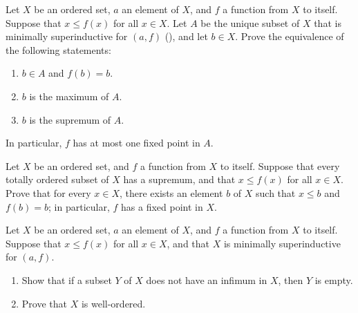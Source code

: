 \documentclass{article}
\begin{document}
\begin{exercise}
  \label{exe:ycuba4tr}
  Let \(X\) be an ordered set, \(a\) an element of \(X\), and \(f\) a
  function from \(X\) to itself.  Suppose that \(x \leq f(x)\) for all
  \(x \in X\).  Let \(A\) be the unique subset of \(X\) that is
  minimally superinductive for \((a, f)\) (), and
  let \(b \in X\).  Prove the equivalence of the following statements:
  \begin{enumerate}
  \item \label{item:31iv9t84} \(b \in A\) and \(f(b) = b\).
  \item \label{item:zg0eno8k} \(b\) is the maximum of \(A\).
  \item \label{item:zhfu99x4} \(b\) is the supremum of \(A\).
  \end{enumerate}
  In particular, \(f\) has at most one fixed point in \(A\).
\end{exercise}

\begin{exercise}
  \label{exe:al7fffh1}
  Let \(X\) be an ordered set, and \(f\) a function from \(X\) to
  itself.  Suppose that every totally ordered subset of \(X\) has a
  supremum, and that \(x \leq f(x)\) for all \(x \in X\).  Prove that
  for every \(x \in X\), there exists an element \(b\) of \(X\) such
  that \(x \leq b\) and \(f(b) = b\); in particular, \(f\) has a fixed
  point in \(X\).
\end{exercise}

\begin{exercise}
  \label{exe:313bq61a}
  Let \(X\) be an ordered set, \(a\) an element of \(X\), and \(f\) a
  function from \(X\) to itself.  Suppose that \(x \leq f(x)\) for all
  \(x \in X\), and that \(X\) is minimally superinductive for
  \((a, f)\).
  \begin{enumerate}
  \item Show that if a subset \(Y\) of \(X\) does not have an infimum
    in \(X\), then \(Y\) is empty.
  \item Prove that \(X\) is well-ordered.
  \end{enumerate}
\end{exercise}
\end{document}
